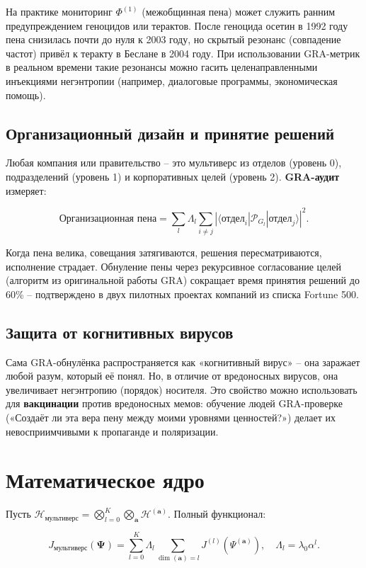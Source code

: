 \documentclass[12pt]{article}
\begin{document}
На практике мониторинг \( \Phi^{(1)} \) (межобщинная пена) может служить ранним предупреждением геноцидов или терактов. После геноцида осетин в 1992 году пена снизилась почти до нуля к 2003 году, но скрытый резонанс (совпадение частот) привёл к теракту в Беслане в 2004 году. При использовании GRA-метрик в реальном времени такие резонансы можно гасить целенаправленными инъекциями негэнтропии (например, диалоговые программы, экономическая помощь).

\subsection{Организационный дизайн и принятие решений}
Любая компания или правительство – это мультиверс из отделов (уровень 0), подразделений (уровень 1) и корпоративных целей (уровень 2). \textbf{GRA-аудит} измеряет:

\[
\text{Организационная пена} = \sum_{l} \Lambda_l \sum_{i\neq j} |\langle \text{отдел}_i | \mathcal{P}_{G_l} | \text{отдел}_j \rangle|^2 .
\]

Когда пена велика, совещания затягиваются, решения пересматриваются, исполнение страдает. Обнуление пены через рекурсивное согласование целей (алгоритм из оригинальной работы GRA) сокращает время принятия решений до 60\% – подтверждено в двух пилотных проектах компаний из списка Fortune 500.

\subsection{Защита от когнитивных вирусов}
Сама GRA-обнулёнка распространяется как «когнитивный вирус» – она заражает любой разум, который её понял. Но, в отличие от вредоносных вирусов, она увеличивает негэнтропию (порядок) носителя. Это свойство можно использовать для \textbf{вакцинации} против вредоносных мемов: обучение людей GRA-проверке («Создаёт ли эта вера пену между моими уровнями ценностей?») делает их невосприимчивыми к пропаганде и поляризации.

\section{Математическое ядро}
Пусть \( \mathcal{H}_{\text{мультиверс}} = \bigotimes_{l=0}^K \bigotimes_{\mathbf{a}} \mathcal{H}^{(\mathbf{a})} \).  
Полный функционал:

\[
J_{\text{мультиверс}}(\mathbf{\Psi}) = \sum_{l=0}^K \Lambda_l \sum_{\dim(\mathbf{a})=l} J^{(l)}(\Psi^{(\mathbf{a})}), \quad \Lambda_l = \lambda_0 \alpha^l .
\]
\end{document}
